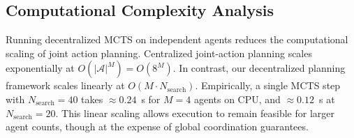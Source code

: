\documentclass[11pt,a4paper]{article}
\begin{document}
\subsection{Computational Complexity Analysis}
Running decentralized MCTS on independent agents reduces the computational scaling of joint action planning. Centralized joint-action planning scales exponentially at $O(|\mathcal{A}|^M) = O(8^M)$. In contrast, our decentralized planning framework scales linearly at $O(M \cdot N_{\mathrm{search}})$. Empirically, a single MCTS step with $N_{\mathrm{search}}=40$ takes $\approx 0.24$~s for $M=4$ agents on CPU, and $\approx 0.12$~s at $N_{\mathrm{search}}=20$. This linear scaling allows execution to remain feasible for larger agent counts, though at the expense of global coordination guarantees.

\end{document}
